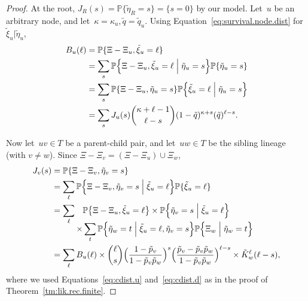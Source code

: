 \documentclass{elsarticle}
\newcommand{\condgen}[6]{{#1}#2 #5 #3 #6 #4}
\newcommand{\PROB}{\mathbb{P}}
\newcommand{\Probcmd}[2]{\condgen{\PROB}{\Bigl\{}{\Bigm|}{\Bigr\}}{#1}{#2}}
\newcommand{\slik}{K}
\newcommand{\nolik}{B}
\newcommand{\solik}{J}
\newcommand{\nx}{u}
\newcommand{\ny}{v}
\newcommand{\nz}{w}
\newcommand{\troot}{R}
\begin{document}
\begin{proof}
At the root, $\solik_{\troot}(s)=\PROB\{\tilde{\eta}_{\troot}=s\}=\{s=0\}$ by our model. 
Let~$\nx$ be an arbitrary node, and let~$\kappa=\kappa_{\nx}, \tilde{q}=\tilde{q}_{\nx}$. 
Using Equation~\eqref{eq:survival.node.dist}
for $\tilde{\xi}_{\nx}|\tilde{\eta}_{\nx}$, 
\begin{align*}
\nolik_{\nx}(\ell) & = \PROB\{\Xi-\Xi_{\nx}, \tilde{\xi}_{\nx}=\ell\}
\\
	& = \sum_{s} \Probcmd{\Xi-\Xi_{\nx}, \tilde{\xi}_{\nx}=\ell}{\tilde{\eta}_{\nx}=s}
		\PROB\{\tilde{\eta}_{\nx}=s\}
\\
	& = \sum_s \PROB\{\Xi-\Xi_{\nx}, \tilde{\eta}_{\nx}=s\}\Probcmd{\tilde{\xi}_{\nx}=\ell}{\tilde{\eta}_{\nx}=s}
\\
	& = \sum_s \solik_{\nx}(s) \binom{\kappa+\ell-1}{\ell-s}(1-\tilde{q})^{\kappa+s} (\tilde{q})^{\ell-s}.
\end{align*}

Now let~$\nx\ny\in T$ be a parent-child pair, and 
let~$\nx\nz\in T$ be the sibling lineage (with $\ny\ne \nz$).
Since $\Xi-\Xi_{\ny} = (\Xi-\Xi_{\nx})\cup \Xi_{\nz}$, 
\begin{align*}
\solik_{\ny}(s) & = \PROB\{\Xi-\Xi_{\ny}, \tilde{\eta}_{\ny}=s\}
\\
	& = \sum_{\ell} \Probcmd{\Xi-\Xi_{\ny}, \tilde{\eta}_{\ny}=s}{\tilde{\xi}_{\nx}=\ell}
		\PROB\{\tilde{\xi}_{\nx}=\ell\}
\\
	& = \sum_{\ell} 
		\begin{aligned}[t]
		& \PROB\bigl\{\Xi-\Xi_{\nx}, \tilde{\xi}_{\nx}=\ell\bigr\}
		\times \Probcmd{\tilde{\eta}_{\ny}=s}{\tilde{\xi}_{\nx}=\ell}
	\\
	\times &  
		\sum_t \Probcmd{\tilde{\eta}_{\nz}=t}{\tilde{\xi}_{\nx}=\ell, \tilde{\eta}_{\ny}=s}
			\Probcmd{\Xi_{\nz}}{\tilde{\eta}_{\nz}=t}
		\end{aligned}
\\
	& = \sum_{\ell} \nolik_{\nx}(\ell) 
		\times 
		\binom{\ell}{s}\Bigl(\frac{1-\tilde{p}_{\ny}}{1-\tilde{p}_{\ny}\tilde{p}_{\nz}}\Bigr)^s
		\Bigl(\frac{\tilde{p}_{\ny}-\tilde{p}_{\ny}\tilde{p}_{\nz}}{1-\tilde{p}_{\ny}\tilde{p}_{\nz}}\Bigr)^{\ell-s}
		\times \tilde{\slik}_{\nz}^{\ell}(\ell-s),
\end{align*}   
where we used Equations~\eqref{eq:cdist.u} and~\eqref{eq:cdist.d} as in the proof of Theorem~\ref{tm:lik.rec.finite}. 
\end{proof}
\end{document}
